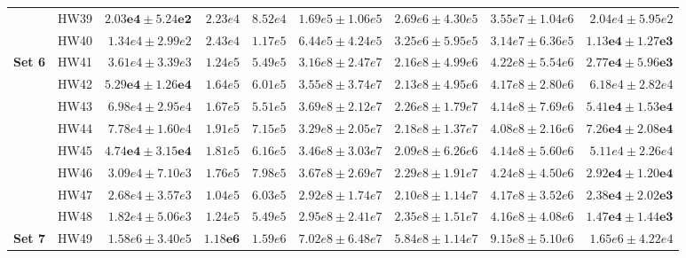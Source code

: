 \documentclass[11pt]{article}
\begin{document}
{\begin{table}
\begin{tabular}{l|r|r|r|r|r|r|r|r}
& HW39 & $\mathbf{2.03e4 \pm 5.24e2}$ & $2.23e4$ & $8.52e4$
& $1.69e5 \pm 1.06e5$
& $2.69e6 \pm 4.30e5$
& $3.55e7 \pm 1.04e6$
& $2.04e4 \pm 5.95e2$ \\

& HW40 & $1.34e4 \pm 2.99e2$ & $2.43e4$ & $1.17e5$
& $6.44e5 \pm 4.24e5$
& $3.25e6 \pm 5.95e5$
& $3.14e7 \pm 6.36e5$
& $\mathbf{1.13e4 \pm 1.27e3}$ \\
\hline

\multirow{8}{*}{\textbf{Set 6}}
& HW41 & $3.61e4 \pm 3.39e3$ & $1.24e5$ & $5.49e5$
& $3.16e8 \pm 2.47e7$
& $2.16e8 \pm 4.99e6$
& $4.22e8 \pm 5.54e6$
& $\mathbf{2.77e4 \pm 5.96e3}$ \\

& HW42 & $\mathbf{5.29e4 \pm 1.26e4}$ & $1.64e5$ & $6.01e5$
& $3.55e8 \pm 3.74e7$
& $2.13e8 \pm 4.95e6$
& $4.17e8 \pm 2.80e6$
& $6.18e4 \pm 2.82e4$ \\

& HW43 & $6.98e4 \pm 2.95e4$ & $1.67e5$ & $5.51e5$
& $3.69e8 \pm 2.12e7$
& $2.26e8 \pm 1.79e7$
& $4.14e8 \pm 7.69e6$
& $\mathbf{5.41e4 \pm 1.53e4}$ \\

& HW44 & $7.78e4 \pm 1.60e4$ & $1.91e5$ & $7.15e5$
& $3.29e8 \pm 2.05e7$
& $2.18e8 \pm 1.37e7$
& $4.08e8 \pm 2.16e6$
& $\mathbf{7.26e4 \pm 2.08e4}$ \\

& HW45 & $\mathbf{4.74e4 \pm 3.15e4}$ & $1.81e5$ & $6.16e5$
& $3.46e8 \pm 3.03e7$
& $2.09e8 \pm 6.26e6$
& $4.14e8 \pm 5.60e6$
& $5.11e4 \pm 2.26e4$ \\

& HW46 & $3.09e4 \pm 7.10e3$ & $1.76e5$ & $7.98e5$
& $3.67e8 \pm 2.69e7$
& $2.29e8 \pm 1.91e7$
& $4.24e8 \pm 4.50e6$
& $\mathbf{2.92e4 \pm 1.20e4}$ \\

& HW47 & $2.68e4 \pm 3.57e3$ & $1.04e5$ & $6.03e5$
& $2.92e8 \pm 1.74e7$
& $2.10e8 \pm 1.14e7$
& $4.17e8 \pm 3.52e6$
& $\mathbf{2.38e4 \pm 2.02e3}$ \\

& HW48 & $1.82e4 \pm 5.06e3$ & $1.24e5$ & $5.49e5$
& $2.95e8 \pm 2.41e7$
& $2.35e8 \pm 1.51e7$
& $4.16e8 \pm 4.08e6$
& $\mathbf{1.47e4 \pm 1.44e3}$ \\
\hline

\multirow{8}{*}{\textbf{Set 7}}
& HW49 & $1.58e6 \pm 3.40e5$ & $\mathbf{1.18e6}$ & $1.59e6$
& $7.02e8 \pm 6.48e7$
& $5.84e8 \pm 1.14e7$
& $9.15e8 \pm 5.10e6$
& $1.65e6 \pm 4.22e4$ \\


\end{tabular}
\end{table}}
\end{document}

